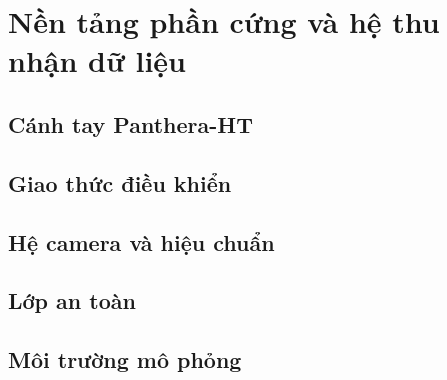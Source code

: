 \section{Nền tảng phần cứng và hệ thu nhận dữ liệu}
\label{sec:hardware}

\subsection{Cánh tay Panthera-HT}

\subsection{Giao thức điều khiển}

\subsection{Hệ camera và hiệu chuẩn}

\subsection{Lớp an toàn}

\subsection{Môi trường mô phỏng}
